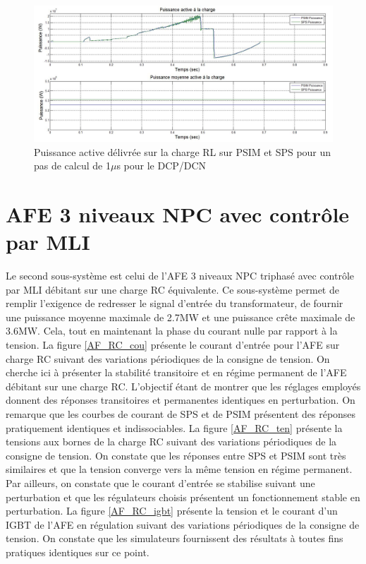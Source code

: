 \begin{figure}[htb]
\centering
\includegraphics[scale=0.5]{fig/P_DCP.jpg}
\caption{Puissance active délivrée sur la charge RL sur PSIM et SPS pour un pas de calcul de 1$\mu$s pour le DCP/DCN}
\label{DC_IG_ten_2}
\end{figure}

\clearpage
\section{AFE 3 niveaux NPC avec contrôle par MLI}

Le second sous-système est celui de l'AFE 3 niveaux NPC triphasé avec contrôle par MLI débitant sur une charge RC équivalente. Ce sous-système permet de remplir l'exigence de redresser le signal d'entrée du transformateur, de fournir une puissance moyenne maximale de 2.7MW et une puissance crête maximale de 3.6MW. Cela, tout en maintenant la phase du courant nulle par rapport à la tension. La figure \ref{AF_RC_cou} présente le courant d'entrée pour l'AFE sur charge RC suivant des variations périodiques de la consigne de tension. On cherche ici à présenter la stabilité transitoire et en régime permanent de l'AFE débitant sur une charge RC. L'objectif étant de montrer que les réglages employés donnent des réponses transitoires et permanentes identiques en perturbation. On remarque que les courbes de courant de SPS et de PSIM présentent des réponses pratiquement identiques et indissociables. La figure \ref{AF_RC_ten} présente la tensions aux bornes de la charge RC suivant des variations périodiques de la consigne de tension. On constate que les réponses entre SPS et PSIM sont très similaires et que la tension converge vers la même tension en régime permanent. Par ailleurs, on constate que le courant d'entrée se stabilise suivant une perturbation et que les régulateurs choisis présentent un fonctionnement stable en perturbation. La figure \ref{AF_RC_igbt}
présente la tension et le courant d'un IGBT de l'AFE en régulation suivant des variations périodiques de la consigne de tension. On constate que les simulateurs fournissent des résultats à toutes fins pratiques identiques sur ce point.

